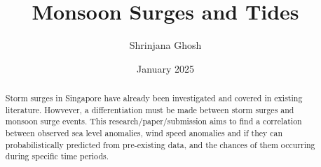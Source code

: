 \documentclass{article}
\begin{document}
\title{Monsoon Surges and Tides}
\author{Shrinjana Ghosh}
\date{January 2025}
\vfill





\maketitle

\begin{abstract}
    Storm surges in Singapore have already been investigated and covered in existing literature. Howvever, a differentiation must be made
    between storm surges and monsoon surge events. This research/paper/submission aims to find a correlation between observed sea level anomalies, wind speed anomalies
    and if they can probabilistically predicted from pre-existing data, and the chances of them occurring during specific time periods. 
\end{abstract}
\end{document}
